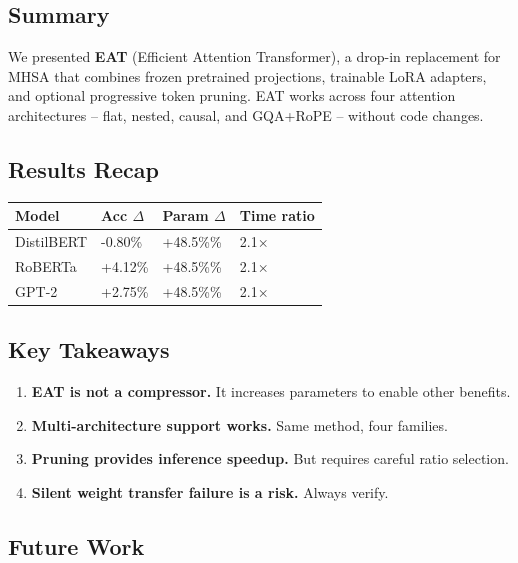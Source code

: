 \subsection{Summary}

We presented \textbf{EAT} (Efficient Attention Transformer), a drop-in replacement 
for MHSA that combines frozen pretrained projections, trainable LoRA adapters, 
and optional progressive token pruning. EAT works across four attention 
architectures -- flat, nested, causal, and GQA+RoPE -- without code changes.

\subsection{Results Recap}

\begin{table}[H]
\centering
\small
\begin{tabular}{llll}
\toprule
\textbf{Model} & \textbf{Acc $\Delta$} & \textbf{Param $\Delta$} & \textbf{Time ratio} \\
\midrule
DistilBERT & -0.80\% & +48.5\%\% & 2.1$\times$ \\
RoBERTa & +4.12\% & +48.5\%\% & 2.1$\times$ \\
GPT-2 & +2.75\% & +48.5\%\% & 2.1$\times$ \\
\bottomrule
\end{tabular}
\end{table}

\subsection{Key Takeaways}

\begin{enumerate}
\item \textbf{EAT is not a compressor.} It increases parameters to enable other
  benefits.
\item \textbf{Multi-architecture support works.} Same method, four families.
\item \textbf{Pruning provides inference speedup.} But requires careful ratio
  selection.
\item \textbf{Silent weight transfer failure is a risk.} Always verify.

\end{enumerate}
\subsection{Future Work}

